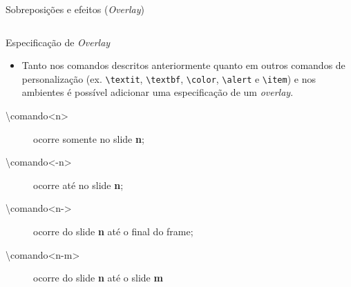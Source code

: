 \begin{frame}[fragile]{Sobreposições e efeitos (\textit{Overlay})}
\begin{columns}

    \end{columns}
\end{frame}

\begin{frame}[fragile]{Especificação de \textit{Overlay}}
    \begin{itemize}
    \item Tanto nos comandos descritos anteriormente quanto em outros comandos de personalização (ex. \verb|\textit|, \verb|\textbf|, \verb|\color|, \verb|\alert| e \verb|\item|) e nos ambientes é possível adicionar uma especificação de um \textit{overlay}.
    \end{itemize}

    \begin{description}
    \item[\textbackslash comando<n>]  ocorre somente no slide \textbf{n};
    \item[\textbackslash comando<-n>]  ocorre até no slide \textbf{n};
    \item[\textbackslash comando<n->]  ocorre do slide \textbf{n} até o final do frame;\
    \item[\textbackslash comando<n-m>]  ocorre do slide \textbf{n} até o slide \textbf{m} 
    \end{description}
\end{frame}

